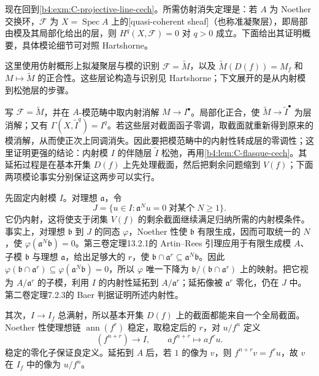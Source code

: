 现在回到\cref{b4:exm:C-projective-line-cech}。所需仿射消失定理是：若 \(A\) 为 Noether 交换环，\(\mathcal F\) 为 \(X=\operatorname{Spec}A\) 上的[quasi-coherent sheaf]（也称准凝聚层），即局部由模及其局部化给出的层，则 \(H^q(X,\mathcal F)=0\) 对 \(q>0\) 成立。下面给出其证明概要，具体模论细节可对照 Hartshorne\cite[Chapter III, Lemmas 3.2--3.3, Proposition 3.4 and Theorem 3.5, pp. 213--215]{Hartshorne1977}。
\begin{proofsketch}
	这里使用仿射概形上拟凝聚层与模的识别 \(\mathcal F=\widetilde M\)，以及 \(\widetilde M(D(f))=M_f\) 和 \(M\mapsto\widetilde M\) 的正合性。这些层论构造与识别见 Hartshorne\cite[Chapter II, Propositions 5.1--5.2 and 5.4, Corollary 5.5, pp. 110--113]{Hartshorne1977}；下文展开的是从内射模到松弛层的步骤。

	写 \(\mathcal F=\widetilde M\)，并在 \(A\)-模范畴中取内射消解 \(M\to I^\bullet\)。局部化正合，使 \(\widetilde M\to\widetilde I^\bullet\) 为层消解；又有 \(\Gamma(X,\widetilde I^q)=I^q\)。若这些层对截面函子零调，取截面就重新得到原来的模消解，从而使正次上同调消失。因此要把模范畴中的内射性转成层的零调性；这里证明更强的结论：内射模 \(I\) 的伴随层 \(\widetilde I\) 松弛，再用\cref{b4:lem:C-flasque-cech}。其延拓过程是在基本开集 \(D(f)\) 上先处理截面，然后把剩余问题缩到 \(V(f)\)；下面两项模论事实分别保证这两步可以实行。

	先固定内射模 \(I\)。对理想 \(\mathfrak a\)，令
	\[
		J=\{u\in I:\mathfrak a^Nu=0\;\text{对某个}\;N\ge1\}.
	\]
	它仍内射，这将使支于闭集 \(V(f)\) 的剩余截面继续满足归纳所需的内射模条件。事实上，对理想 \(\mathfrak b\) 到 \(J\) 的同态 \(\varphi\)，Noether 性使 \(\mathfrak b\) 有限生成，因而可取统一的 \(N\)，使 \(\varphi(\mathfrak a^N\mathfrak b)=0\)。第三卷定理13.2.1的 Artin--Rees 引理应用于有限生成模 \(A\)、子模 \(\mathfrak b\) 与理想 \(\mathfrak a\)，给出足够大的 \(r\)，使 \(\mathfrak b\cap\mathfrak a^r\subseteq\mathfrak a^N\mathfrak b\)。因此 \(\varphi(\mathfrak b\cap\mathfrak a^r)\subseteq\varphi(\mathfrak a^N\mathfrak b)=0\)，所以 \(\varphi\) 唯一下降为 \(\mathfrak b/(\mathfrak b\cap\mathfrak a^r)\) 上的映射。把它视为 \(A/\mathfrak a^r\) 的子模，利用 \(I\) 的内射性延拓到 \(A/\mathfrak a^r\)；延拓像被 \(\mathfrak a^r\) 零化，仍在 \(J\) 中。第二卷定理7.2.3的 Baer 判据证明所述内射性。

	其次，\(I\to I_f\) 总满射，所以基本开集 \(D(f)\) 上的截面都能来自一个全局截面。Noether 性使理想链 \(\operatorname{ann}(f^r)\) 稳定，取稳定后的 \(r\)，对 \(u/f^n\) 定义
	\[
		(f^{n+r})\longrightarrow I,\qquad af^{n+r}\longmapsto af^ru.
	\]
	稳定的零化子保证良定义。延拓到 \(A\) 后，若 \(1\) 的像为 \(v\)，则 \(f^{n+r}v=f^ru\)，故 \(v\) 在 \(I_f\) 中的像为 \(u/f^n\)。


\end{proofsketch}
